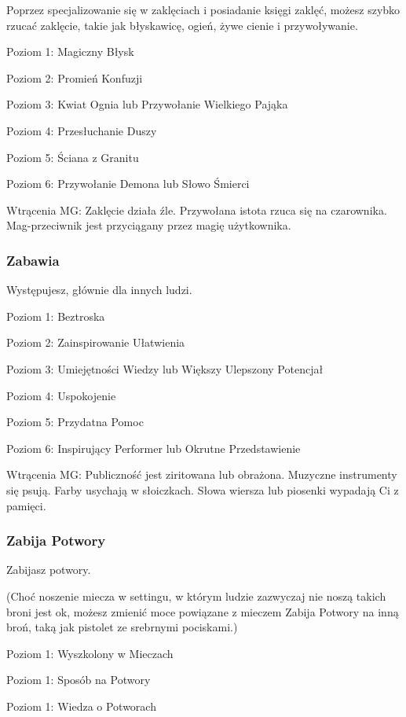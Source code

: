 Poprzez specjalizowanie się w zaklęciach i posiadanie księgi zaklęć, możesz szybko rzucać zaklęcie, takie jak błyskawicę, ogień, żywe cienie i przywoływanie. 

Poziom 1: Magiczny Błysk

Poziom 2: Promień Konfuzji

Poziom 3: Kwiat Ognia lub Przywołanie Wielkiego Pająka

Poziom 4: Przesłuchanie Duszy

Poziom 5: Ściana z Granitu

Poziom 6: Przywołanie Demona lub Słowo Śmierci

Wtrącenia MG: Zaklęcie działa źle. Przywołana istota rzuca się na czarownika. Mag-przeciwnik jest przyciągany przez magię użytkownika. 

\subsubsection{Zabawia}

Występujesz, głównie dla innych ludzi.

Poziom 1: Beztroska

Poziom 2: Zainspirowanie Ułatwienia

Poziom 3: Umiejętności Wiedzy lub Większy Ulepszony Potencjał

Poziom 4: Uspokojenie

Poziom 5: Przydatna Pomoc

Poziom 6: Inspirujący Performer lub Okrutne Przedstawienie

Wtrącenia MG: Publiczność jest ziritowana lub obrażona. Muzyczne instrumenty się psują. Farby usychają w słoiczkach. Słowa wiersza lub piosenki wypadają Ci z pamięci.

\subsubsection{Zabija Potwory}

Zabijasz potwory.

(Choć noszenie miecza w settingu, w którym ludzie zazwyczaj nie noszą takich broni jest ok, możesz zmienić moce powiązane z mieczem Zabija Potwory na inną broń, taką jak pistolet ze srebrnymi pociskami.)

Poziom 1: Wyszkolony w Mieczach

Poziom 1: Sposób na Potwory

Poziom 1: Wiedza o Potworach

